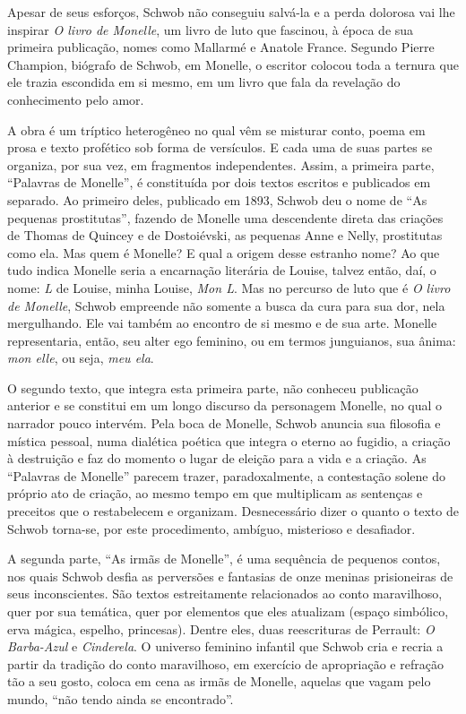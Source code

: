 Apesar de seus esforços, Schwob não conseguiu salvá-la e a perda dolorosa
vai lhe inspirar \textit{O livro de Monelle}, um livro de luto que fascinou, à
época de sua primeira publicação, nomes como Mallarmé e Anatole France.
Segundo Pierre Champion, biógrafo de Schwob, em Monelle, o escritor colocou
toda a ternura que ele trazia escondida em si mesmo, em um livro que fala da
revelação do conhecimento pelo amor.

A obra é um tríptico heterogêneo no qual vêm se misturar conto, poema em
prosa e texto profético sob forma de versículos. E cada uma de suas partes se
organiza, por sua vez, em fragmentos independentes. Assim, a primeira parte,
``Palavras de Monelle'', é constituída por dois textos escritos e
publicados em separado. Ao primeiro deles, publicado em 1893, Schwob deu o nome
de ``As pequenas prostitutas'', fazendo de Monelle uma descendente direta
das criações de Thomas de Quincey e de Dostoiévski, as pequenas Anne e Nelly,
prostitutas como ela. Mas quem é Monelle? E qual a origem desse estranho nome?
Ao que tudo indica Monelle seria a encarnação literária de Louise, talvez então, daí,
o nome: \textit{L} de Louise, minha Louise, \textit{Mon L}. Mas no percurso de luto
que é \textit{O livro de Monelle}, Schwob empreende não somente a busca da cura para
sua dor, nela mergulhando. Ele vai também ao encontro de si mesmo e de sua arte.
Monelle representaria, então, seu alter ego feminino, ou em termos junguianos,
sua ânima: \textit{mon elle}, ou seja, \textit{meu ela}.

O segundo texto, que integra esta primeira parte, não conheceu publicação
anterior e se constitui em um longo discurso da personagem Monelle, no qual o
narrador pouco intervém. Pela boca de Monelle, Schwob anuncia sua filosofia e
mística pessoal, numa dialética poética que integra o eterno ao fugidio, a
criação à destruição e faz do momento o lugar de eleição para a vida e a
criação. As ``Palavras de Monelle'' parecem trazer, paradoxalmente, a
contestação solene do próprio ato de criação, ao mesmo tempo em que multiplicam
as sentenças e preceitos que o restabelecem e organizam. Desnecessário dizer o
quanto o texto de Schwob torna-se, por este procedimento, ambíguo, misterioso e
desafiador.

A segunda parte, ``As irmãs de Monelle'', é uma sequência de pequenos
contos, nos quais Schwob desfia as perversões e fantasias de onze meninas
prisioneiras de seus inconscientes. São textos estreitamente relacionados ao
conto maravilhoso, quer por sua temática, quer por elementos que eles atualizam
(espaço simbólico, erva mágica, espelho, princesas). Dentre eles, duas
reescrituras de Perrault: \textit{O Barba-Azul} e \textit{Cinderela}. O
universo feminino infantil que Schwob cria e recria a partir da tradição do
conto maravilhoso, em exercício de apropriação e refração tão a seu gosto,
coloca em cena as irmãs de Monelle, aquelas que vagam pelo mundo, “não tendo
ainda se encontrado”. 

